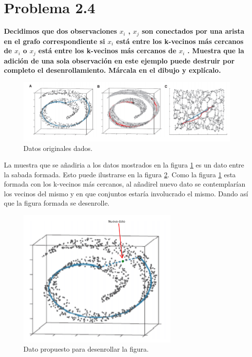 \section*{Problema 2.4}

\textbf{Decidimos que dos observaciones $x_i$ , $x_j$ son conectados por una arista en el grafo correspondiente si $x_i$ está entre los k-vecinos más cercanos de $x_i$ o $x_j$ está entre los k-vecinos más cercanos de $x_i$ . Muestra que la adición de una sola observación en este ejemplo puede destruir por completo el desenrollamiento. Márcala en el dibujo y explícalo.}

\begin{figure}[H]
    \centering
    \includegraphics[width=13cm]{Graphics/Problema_2_4.png}
    \caption{Datos originales dados.}
    \label{fig:problema2.4}
\end{figure}

La muestra que se añadiria a los datos mostrados en la figura \ref{fig:problema2.4} es un dato entre la sabada formada. Esto puede ilustrarse en la figura \ref{fig:problema2.4_answer}. Como la figura \ref{fig:problema2.4} esta formada con los k-vecinos más cercanos, al añadirel nuevo dato se contemplarían los vecinos del mismo y en que conjuntos estaría involucrado el mismo. Dando así que la figura formada se desenrolle.

\begin{figure}[H]
    \centering
    \includegraphics[width=8cm]{Graphics/Problema_2_4_answer.png}
    \caption{Dato propuesto para desenrollar la figura.}
    \label{fig:problema2.4_answer}
\end{figure}
